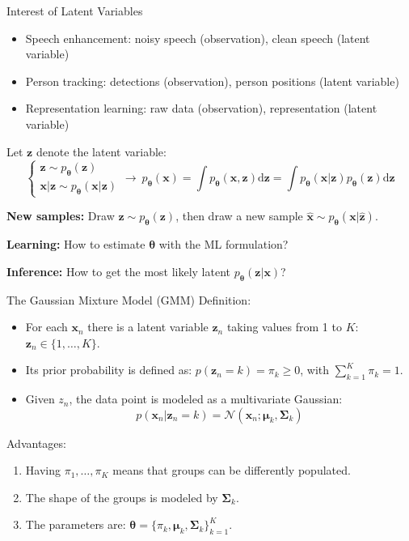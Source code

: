 \documentclass[aspectratio=169]{beamer}
\newcommand{\bs}[1]{\boldsymbol{#1}}
\begin{document}
\begin{frame}{Interest of Latent Variables}
\begin{itemize}
 \item Speech enhancement: noisy speech (observation), clean speech (latent variable)
 \item Person tracking: detections (observation), person positions (latent variable)
 \item Representation learning: raw data (observation), representation (latent variable)
\end{itemize}\pause

Let $\bs{z}$ denote the latent variable:
\[
\begin{cases}
\bs{z}\sim p_{\bs{\theta}}(\bs{z})\\
\bs{x}|\bs{z}\sim p_{\bs{\theta}}(\bs{x}|\bs{z})
\end{cases}\rightarrow~ p_{\bs{\theta}}(\bs{x})=\int p_{\bs{\theta}}(\bs{x}, \bs{z}) \textrm{d}\bs{z} = \int p_{\bs{\theta}}(\bs{x}|\bs{z})p_{\bs{\theta}}(\bs{z}) \textrm{d}\bs{z}\]

\pause
\textbf{New samples:} Draw $ \hat{\bs{z}} \sim p_{\bs{\theta}}(\bs{z}) $, then draw a new sample $ \hat{\bs{x}} \sim p_{\bs{\theta}}(\bs{x}|\hat{\bs{z}}) $.

\textbf{Learning:} How to estimate $\bs{\theta}$ with the ML formulation?

\textbf{Inference:} How to get the most likely latent $p_{\bs{\theta}}(\bs{z}
|\bs{x})$?
\end{frame}

\begin{frame}{The Gaussian Mixture Model (GMM)}
Definition:
\begin{itemize}
 \item For each $\bs{x}_n$ there is a latent variable $\bs{z}_n$ taking values from 1 to $K$: $\bs{z}_n\in\{1,\ldots,K\}$.\pause
 \item Its prior probability is defined as: $p(\bs{z}_n=k)=\pi_k\geq0$, with $\sum_{k=1}^K \pi_k = 1$.\pause
 \item Given $z_n$, the data point is modeled as a multivariate Gaussian:\vspace{-2mm}
 \[p(\bs{x}_n|\bs{z}_n=k) = \mathcal{N}(\bs{x}_n;\bs{\mu}_k,\bs{\Sigma}_k) \]
\end{itemize}
Advantages:
 \begin{enumerate}
  \item Having $\pi_1,\ldots,\pi_K$ means that groups can be differently populated.
  \item The shape of the groups is modeled by $\bs{\Sigma}_k$.
  \item The parameters are: {\color{orange}$\bs{\theta}=\{\pi_k,\bs{\mu}_k,\bs{\Sigma}_k\}_{k=1}^K$}.
 \end{enumerate}
\end{frame}
\end{document}
